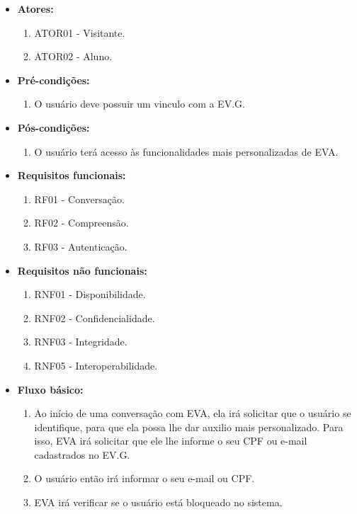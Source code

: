 \begin{itemize}
    \item \textbf{Atores:}
        \begin{enumerate}
            \item ATOR01 - Visitante.
            \item ATOR02 - Aluno.
        \end{enumerate}
    \item \textbf{Pré-condições:}
        \begin{enumerate}
            \item O usuário deve possuir um vinculo com a EV.G.
        \end{enumerate}
    \item \textbf{Pós-condições:}
        \begin{enumerate}
            \item O usuário terá acesso às funcionalidades mais personalizadas de EVA.
        \end{enumerate}
    \item \textbf{Requisitos funcionais:}
        \begin{enumerate}
            \item RF01 - Conversação.
            \item RF02 - Compreensão.
            \item RF03 - Autenticação.
        \end{enumerate}
    \item \textbf{Requisitos não funcionais:}
        \begin{enumerate}
            \item RNF01 - Disponibilidade.
            \item RNF02 - Confidencialidade.
            \item RNF03 - Integridade.
            \item RNF05 - Interoperabilidade.
        \end{enumerate}
    \item \textbf{Fluxo básico:}
        \begin{enumerate}
            \item Ao início de uma conversação com EVA, ela irá solicitar que o usuário se identifique, para que ela possa lhe dar auxilio mais personalizado. Para isso, EVA irá solicitar que ele lhe informe o seu CPF ou e-mail cadastrados no EV.G.
            \item O usuário então irá informar o seu e-mail ou CPF.
            \item EVA irá verificar se o usuário está bloqueado no sistema.

\end{enumerate}
\end{itemize}
